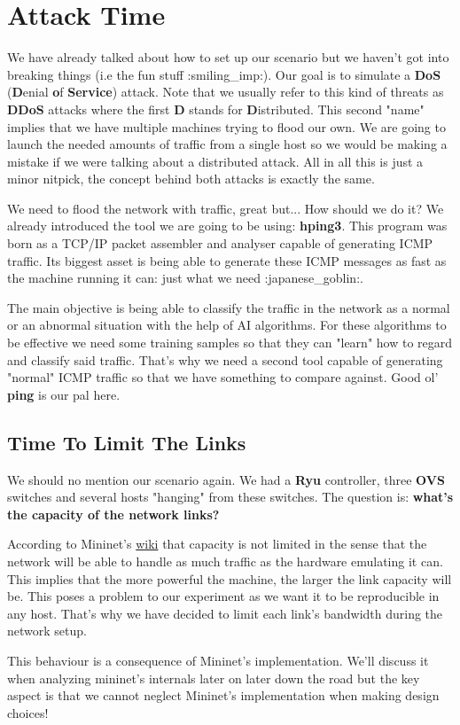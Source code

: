 \documentclass[12pt]{report}
\newcommand{\newpar} {
    \vskip 1cm
}
\begin{document}
	\section{Attack Time}
		We have already talked about how to set up our scenario but we haven't got into breaking things (i.e the fun stuff :smiling_imp:). Our goal is to simulate a \textbf{DoS} (\textbf{D}enial \textbf{o}f \textbf{Service}) attack. Note that we usually refer to this kind of threats as \textbf{DDoS} attacks where the first \textbf{D} stands for \textbf{D}istributed. This second "name" implies that we have multiple machines trying to flood our own. We are going to launch the needed amounts of traffic from a single host so we would be making a mistake if we were talking about a distributed attack. All in all this is just a minor nitpick, the concept behind both attacks is exactly the same.
		\newpar
		We need to flood the network with traffic, great but... How should we do it? We already introduced the tool we are going to be using: \textbf{hping3}. This program was born as a TCP/IP packet assembler and analyser capable of generating ICMP traffic. Its biggest asset is being able to generate these ICMP messages as fast as the machine running it can: just what we need :japanese_goblin:.
		\newpar
		The main objective is being able to classify the traffic in the network as a normal or an abnormal situation with the help of AI algorithms. For these algorithms to be effective we need some training samples so that they can "learn" how to regard and classify said traffic. That's why we need a second tool capable of generating "normal" ICMP traffic so that we have something to compare against. Good ol' \textbf{ping} is our pal here.

		\subsection{Time To Limit The Links}
			We should no mention our scenario again. We had a \textbf{Ryu} controller, three \textbf{OVS} switches and several hosts "hanging" from these switches. The question is: \textbf{what's the capacity of the network links?}
			\newpar
			According to Mininet's \href{https://github.com/mininet/mininet/wiki/Introduction-to-Mininet}{wiki} that capacity is not limited in the sense that the network will be able to handle as much traffic as the hardware emulating it can. This implies that the more powerful the machine, the larger the link capacity will be. This poses a problem to our experiment as we want it to be reproducible in any host. That's why we have decided to limit each link's bandwidth during the network setup.
			\newpar
			This behaviour is a consequence of Mininet's implementation. We'll discuss it when analyzing mininet's internals later on later down the road but the key aspect is that we cannot neglect Mininet's implementation when making design choices!
\end{document}
